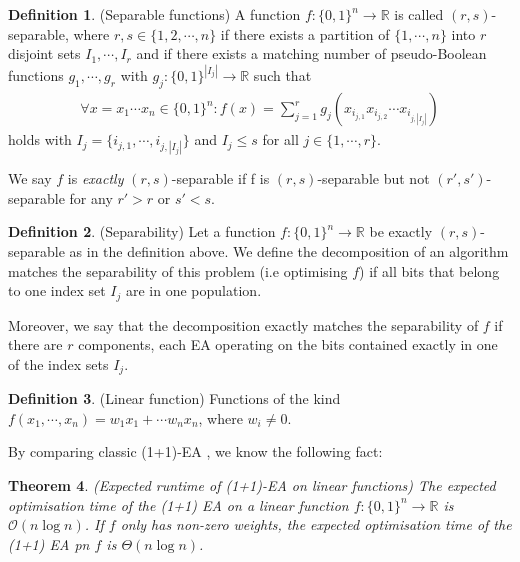 \documentclass[a4paper,11pt]{report}
\theoremstyle{plain} %
\newtheorem{thm}{Theorem}[section]
\theoremstyle{definition} %
\newtheorem{defn}[thm]{Definition}
\theoremstyle{remark} %
\begin{document}
\begin{defn}(Separable functions) A function $f:\{0,1\}^n \rightarrow \mathbb{R}$ is called $(r,s)$-separable, where $r,s\in \{1,2,\cdots ,n\}$ if there exists a partition of $\{1, \cdots ,n\}$ into $r$ disjoint sets $I_{1},\cdots ,I_{r}$ and if there exists a matching number of pseudo-Boolean functions $g_{1},\cdots ,g_{r}$ with $g_{j}:\{0,1\}^{|I_{j}|} \rightarrow \mathbb{R}$ such that 
\begin{align*}
   \forall	 x= x_{1}\cdots x_{n} \in \{0,1\}^n:  f(x)= \sum_{j=1}^r g_{j}(x_{i_{j,1}}x_{i_{j,2}}\cdots x_{i_{j,|I_{j}|}} )
\end{align*}
holds with $I_{j}=\{i_{j,1}, \cdots , i_{j,|I_{j}|}\}$ and $I_{j}\leq s$ for all $j\in \{1, \cdots ,r\}$.
\par We say $f$ is \textit{exactly} $(r,s)$-separable if f is $(r, s)$-separable but not $(r', s')$-separable for
any $r' > r$ or $s' < s$. 
\end{defn}

\begin{defn} (Separability) Let a function $f:\{0,1\}^n \rightarrow \mathbb{R}$ be exactly $(r,s)$-separable as in the definition above. We define the decomposition of an algorithm matches the separability of this problem (i.e optimising $f$) if all bits that belong to one index set $I_{j}$ are in one population. 
\par Moreover, we say that the decomposition exactly matches the separability of $f$ if there are $r$ components, each EA operating on the bits contained exactly in one of the index sets $I_{j}$.

\end{defn}

\begin{defn}(Linear function) Functions of the kind $f(x_{1},\cdots ,x_{n})=w_{1}x_{1}+\cdots w_{n}x_{n}$, where $w_{i}\neq 0$.

\end{defn}

\par By comparing classic (1+1)-EA \citep{droste_analysis_2002}, we know the following fact:

\begin{thm}(Expected runtime of (1+1)-EA on linear functions) The expected optimisation time of the (1+1) EA on a linear function $f:\{0,1\}^n \rightarrow \mathbb{R}$ is $\mathcal{O}(n\log n)$. If $f$ only has non-zero weights, the expected optimisation time of the (1+1) EA pn $f$ is $\Theta (n\log n)$.

\end{thm}
\end{document}

